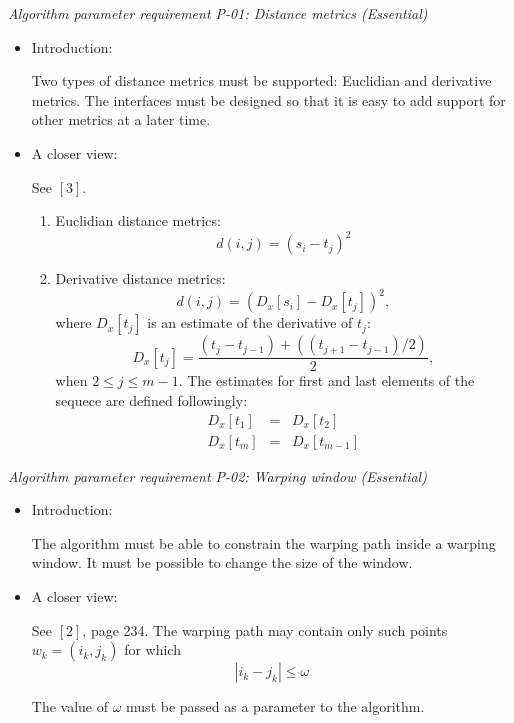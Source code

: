 \documentclass[a4paper,11pt]{article}
\begin{document}
\noindent \emph{Algorithm parameter requirement P-01: Distance metrics (Essential)}
\begin{itemize}
\item Introduction:

Two types of distance metrics must be supported: Euclidian and derivative metrics. The interfaces
must be designed so that it is easy to add support for other metrics at a later time.

\item A closer view:

See $[3]$.
\begin{enumerate}
\item Euclidian distance metrics:
\begin{equation}
d(i,j)=(s_i-t_j)^2
\end{equation}
\item Derivative distance metrics:
\begin{equation}
d(i,j)=(D_x[s_i]-D_x[t_j])^2,
\end{equation}
where $D_x[t_j]$ is an estimate of the derivative of $t_j$:
\begin{equation}
D_x[t_j]=\frac{(t_j-t_{j-1})+((t_{j+1}-t_{j-1})/2)}{2},
\end{equation}
when $2 \leq j \leq m-1$. The estimates for first and last elements of the sequece are defined followingly:
\begin{equation}
\begin{array}{rcl}
D_x[t_1] &=& D_x[t_2] \\
D_x[t_m] &=& D_x[t_{m-1}]
\end{array}
\end{equation}
\end{enumerate}

\end{itemize}




\noindent \emph{Algorithm parameter requirement P-02: Warping window (Essential)}
\begin{itemize}
\item Introduction:

The algorithm must be able to constrain the warping path inside a warping window. It must be possible
to change the size of the window.

\item A closer view:

See $[2]$, page 234. The warping path may contain only such points 
$w_k=(i_k,j_k)$ for which 
\begin{equation}
|i_k-j_k| \leq \omega
\end{equation}

The value of $\omega$ must be passed as a parameter to the algorithm.
\end{itemize}
\end{document}
